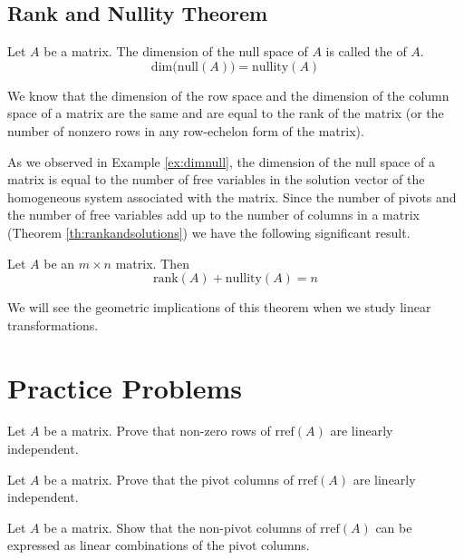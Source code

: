 \documentclass{ximera}
\begin{document}
\subsection*{Rank and Nullity Theorem}
\begin{definition}\label{def:matrixnullity}
Let $A$ be a matrix.  The dimension of the null space of $A$ is called the  of $A$.
$$\mbox{dim}\Big(\mbox{null}(A)\Big)=\mbox{nullity}(A)$$
\end{definition}

We know that the dimension of the row space and the dimension of the column space of a matrix are the same and are equal to the rank of the matrix (or the number of nonzero rows in any row-echelon form of the matrix).

As we observed in Example \ref{ex:dimnull}, the dimension of the null space of a matrix is equal to the number of free variables in the solution vector of the homogeneous system associated with the matrix.  Since the number of pivots and the number of free variables add up to the number of columns in a matrix (Theorem \ref{th:rankandsolutions}) we have the following significant result.

\begin{theorem}\label{th:matrixranknullity} Let $A$ be an $m\times n$ matrix.  Then 
$$\mbox{rank}(A)+\mbox{nullity}(A)=n$$
\end{theorem}
We will see the geometric implications of this theorem when we study linear transformations.

\section*{Practice Problems}
\begin{problem}\label{prob:rowsofRREFlinind}
    Let $A$ be a matrix.  Prove that non-zero rows of $\text{rref}(A)$ are linearly independent.
\end{problem}

\begin{problem}\label{prob:pivColsofRREFlinind}
    Let $A$ be a matrix.  Prove that the pivot columns of $\text{rref}(A)$ are linearly independent.
\end{problem}

\begin{problem}\label{prob:nonpivColsofRREFlincomb}
    Let $A$ be a matrix.  Show that the non-pivot columns of $\text{rref}(A)$ can be expressed as linear combinations of the pivot columns.
\end{problem}
\end{document}
